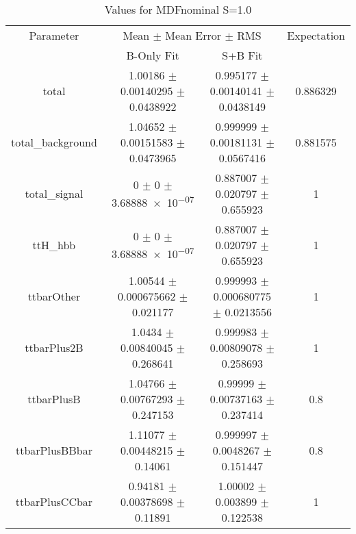 \begin{table}
\centering
\caption{Values for MDFnominal S=1.0}
\begin{tabular}{cccc}
\toprule
Parameter & \multicolumn{2}{c}{Mean $\pm$ Mean Error $\pm$ RMS} & Expectation\\
 & B-Only Fit & S+B Fit & \\
\midrule
total & \num{1.00186} $\pm$ \num{0.00140295} $\pm$ \num{0.0438922} & \num{0.995177} $\pm$ \num{0.00140141} $\pm$ \num{0.0438149} & \num{0.886329}\\
total\_background & \num{1.04652} $\pm$ \num{0.00151583} $\pm$ \num{0.0473965} & \num{0.999999} $\pm$ \num{0.00181131} $\pm$ \num{0.0567416} & \num{0.881575}\\
total\_signal & \num{0} $\pm$ \num{0} $\pm$ \num{3.68888e-07} & \num{0.887007} $\pm$ \num{0.020797} $\pm$ \num{0.655923} & \num{1}\\
ttH\_hbb & \num{0} $\pm$ \num{0} $\pm$ \num{3.68888e-07} & \num{0.887007} $\pm$ \num{0.020797} $\pm$ \num{0.655923} & \num{1}\\
ttbarOther & \num{1.00544} $\pm$ \num{0.000675662} $\pm$ \num{0.021177} & \num{0.999993} $\pm$ \num{0.000680775} $\pm$ \num{0.0213556} & \num{1}\\
ttbarPlus2B & \num{1.0434} $\pm$ \num{0.00840045} $\pm$ \num{0.268641} & \num{0.999983} $\pm$ \num{0.00809078} $\pm$ \num{0.258693} & \num{1}\\
ttbarPlusB & \num{1.04766} $\pm$ \num{0.00767293} $\pm$ \num{0.247153} & \num{0.99999} $\pm$ \num{0.00737163} $\pm$ \num{0.237414} & \num{0.8}\\
ttbarPlusBBbar & \num{1.11077} $\pm$ \num{0.00448215} $\pm$ \num{0.14061} & \num{0.999997} $\pm$ \num{0.0048267} $\pm$ \num{0.151447} & \num{0.8}\\
ttbarPlusCCbar & \num{0.94181} $\pm$ \num{0.00378698} $\pm$ \num{0.11891} & \num{1.00002} $\pm$ \num{0.003899} $\pm$ \num{0.122538} & \num{1}\\
\bottomrule
\end{tabular}
\end{table}